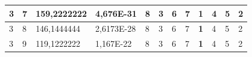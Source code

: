 \documentclass[conference]{IEEEtran}
\begin{document}
\begin{table}[]
\begin{tabular}{|llll|llllllll|}
\multicolumn{1}{|l|}{3}                                                              & \multicolumn{1}{l|}{7}                                                                 & \multicolumn{1}{l|}{159,2222222}                                                           & 4,676E-31                               & \multicolumn{1}{l|}{8}                                                           & \multicolumn{1}{l|}{3}                                                           & \multicolumn{1}{l|}{6}                                                           & \multicolumn{1}{l|}{7}                                                           & \multicolumn{1}{l|}{\textbf{1}}                                                  & \multicolumn{1}{l|}{4}                                                           & \multicolumn{1}{l|}{5}                                                           & 2                                   \\ \hline
\multicolumn{1}{|l|}{3}                                                              & \multicolumn{1}{l|}{8}                                                                 & \multicolumn{1}{l|}{146,1444444}                                                           & 2,6173E-28                              & \multicolumn{1}{l|}{8}                                                           & \multicolumn{1}{l|}{3}                                                           & \multicolumn{1}{l|}{6}                                                           & \multicolumn{1}{l|}{7}                                                           & \multicolumn{1}{l|}{\textbf{1}}                                                  & \multicolumn{1}{l|}{4}                                                           & \multicolumn{1}{l|}{5}                                                           & 2                                   \\ \hline
\multicolumn{1}{|l|}{3}                                                              & \multicolumn{1}{l|}{9}                                                                 & \multicolumn{1}{l|}{119,1222222}                                                           & 1,167E-22                               & \multicolumn{1}{l|}{8}                                                           & \multicolumn{1}{l|}{3}                                                           & \multicolumn{1}{l|}{6}                                                           & \multicolumn{1}{l|}{7}                                                           & \multicolumn{1}{l|}{\textbf{1}}                                                  & \multicolumn{1}{l|}{4}                                                           & \multicolumn{1}{l|}{5}                                                           & 2                                   \\ \hline

\end{tabular}
\end{table}
\end{document}
